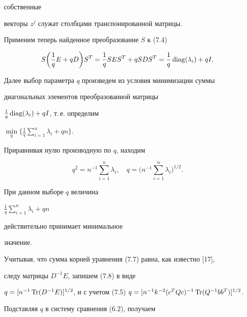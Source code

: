 собственные 


векторы $z^j$ служат столбцами транспонированной матрицы. 


 


Применим теперь найденное преобразование $S$ к (7.4) 


$$ 


S\bigg(\frac{1}{q}E+q D \bigg)S^T=\frac{1}{q} 


S E S^T+q S D S^T=\frac{1}{q}\diag(\lambda_i)+q I. 


$$ 


Далее выбор параметра $q$ произведем из условия минимизации суммы 


диагональных элементов преобразованной матрицы 


$\frac{1}{q}\operatorname{diag}(\lambda_i)+q I$, т.\,е. определим 


$\min\limits_q\Big\{\frac{1}{q}\sum\limits^n_{i=1} \lambda_i+q n\Big\}$. 


Приравнивая нулю производную по $q$, находим 


\begin{equation} 


q^2=n^{-1}\sum^n_{i=1}\lambda_i,\quad 


q=\bigg(n^{-1}\sum^n_{i=1}\lambda_i \bigg)^{1/2}. 


\end{equation} 


При данном выборе $q$ величина 


$\frac{1}{q}\sum\limits^n_{i=1}\lambda_i+q n$ 


действительно принимает минимальное 


значение. 


 


Учитывая, что сумма корней уравнения (7.7) равна, как известно [17], 


следу матрицы $D^{-1}E$, запишем (7.8) в виде 


$q=[n^{-1}\Tr(D^{-1}E)]^{1/2}$, и с учетом (7.5) $q=[n^{-1}k^{-2}(c^T Q 


c)^{-1}\Tr(Q^{-1}b b^T)]^{1/2}$. 


Подставляя $q$ в систему сравнения (6.2), получаем 


